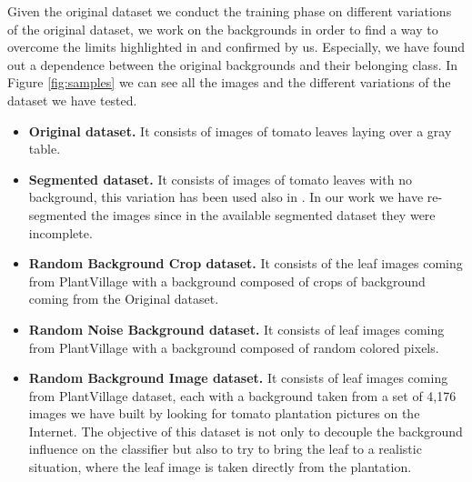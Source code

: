 Given the original dataset we conduct the training phase on different variations of the original dataset, we work on the backgrounds in order to find a way to overcome the limits highlighted in \cite{ref33, ref10} and confirmed by us. Especially, we have found out a dependence between the original backgrounds and their belonging class.
In Figure \ref{fig:samples} we can see all the images and the different variations of the dataset we have tested.
\begin{itemize}
	\vspace{-5pt}
	\item{\textbf{Original dataset.} It consists of images of tomato leaves laying over a gray table.}
	\vspace{-5pt}
	\item{\textbf{Segmented dataset.} It consists of images of tomato leaves with no background, this variation has been used also in \cite{ref10}. In our work we have re-segmented the images since in the available segmented dataset they were incomplete.}
	\vspace{-5pt}
	\item{\textbf{Random Background Crop dataset.} It consists of the leaf images coming from PlantVillage with a background composed of crops of background coming from the Original dataset.}
	\vspace{-5pt}
	\item{\textbf{Random Noise Background dataset.} It consists of leaf images coming from PlantVillage with a background composed of random colored pixels.}
	\vspace{-5pt}
	\item{\textbf{Random Background Image dataset.} It consists of leaf images coming from PlantVillage dataset, each with a background taken from a set of 4,176 images we have built by looking for tomato plantation pictures on the Internet. The objective of this dataset is not only to decouple the background influence on the classifier but also to try to bring the leaf to a realistic situation, where the leaf image is taken directly from the plantation.}
\end{itemize}
